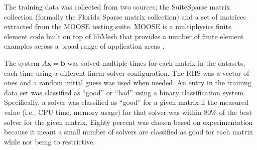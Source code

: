 

The training data was collected from two sources; the SuiteSparse matrix collection (formally the Florida Sparse matrix collection) and a set of matrices extracted from the MOOSE testing suite. MOOSE is a multiphysics finite element code built on top of libMesh that provides a number of finite element examples across a broad range of application areas \cite{MOOSE}. 

The system $A\mathbf{x} = \mathbf{b}$ was solved multiple times for each matrix in the datasets, each time using a different linear solver configuration. The RHS was a vector of ones and a random initial guess was used when needed. An entry in the training data set was classified as ``good'' or ``bad'' using a binary classification system. Specifically, a solver was classified as ``good'' for a given matrix if the measured value (i.e., CPU time, memory usage) for that solver was within $80\%$ of the best solver for the given matrix. Eighty percent was chosen based on experimentation because it meant a small number of solvers are classified as good for each matrix while not being to restrictive.  


